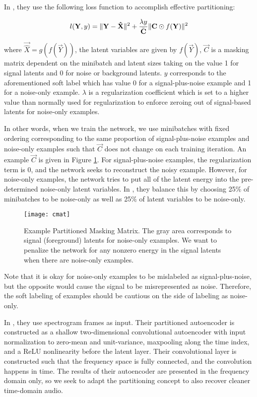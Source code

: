 In \cite{stow}, they use the following loss function to accomplish effective partitioning:

\begin{equation}\label{eq:stowloss}
l(\mathbf{Y}, y) = \lVert \mathbf{Y} - \mathbf{\hat{X}}\rVert^{2} + \dfrac{\lambda y}{\bar{\mathbf{C}}} \lVert\mathbf{C} \odot f(\mathbf{Y})\rVert^{2}
\end{equation}

where $\vec{\hat{X}}=g(f(\vec{Y}))$, the latent variables are given by $f(\vec{Y})$, $\vec{C}$ is a masking matrix dependent on the minibatch and latent sizes taking on the value 1 for signal latents and 0 for noise or background latents. $y$ corresponds to the aforementioned soft label which has value 0 for a signal-plus-noise example and 1 for a noise-only example. $\lambda$ is a regularization coefficient which is set to a higher value than normally used for regularization to enforce zeroing out of signal-based latents for noise-only examples.

In other words, when we train the network, we use minibatches with fixed ordering corresponding to the same proportion of signal-plus-noise examples and noise-only examples such that $\vec{C}$ does not change on each training iteration. An example $\vec{C}$ is given in Figure \ref{fig:cmat}. For signal-plus-noise examples, the regularization term is 0, and the network seeks to reconstruct the noisy example. However, for noise-only examples, the network tries to put all of the latent energy into the pre-determined noise-only latent variables. In \cite{stow}, they balance this by choosing 25\% of minibatches to be noise-only as well as 25\% of latent variables to be noise-only.

\begin{figure}[!ht]
\centering
\texttt{[image: cmat]}
\caption[Example Partitioned Masking Matrix]{Example Partitioned Masking Matrix. \cite{stow} The gray area corresponds to signal (foreground) latents for noise-only examples. We want to penalize the network for any nonzero energy in the signal latents when there are noise-only examples.}
\label{fig:cmat}
\end{figure}

Note that it is okay for noise-only examples to be mislabeled as signal-plus-noise, but the opposite would cause the signal to be misrepresented as noise. Therefore, the soft labeling of examples should be cautious on the side of labeling as noise-only.

In \cite{stow}, they use spectrogram frames as input. Their partitioned autoencoder is constructed as a shallow two-dimensional convolutional autoencoder with input normalization to zero-mean and unit-variance, maxpooling along the time index, and a ReLU nonlinearity before the latent layer. Their convolutional layer is constructed such that the frequency space is fully connected, and the convolution happens in time. The results of their autoencoder are presented in the frequency domain only, so we seek to adapt the partitioning concept to also recover cleaner time-domain audio.


